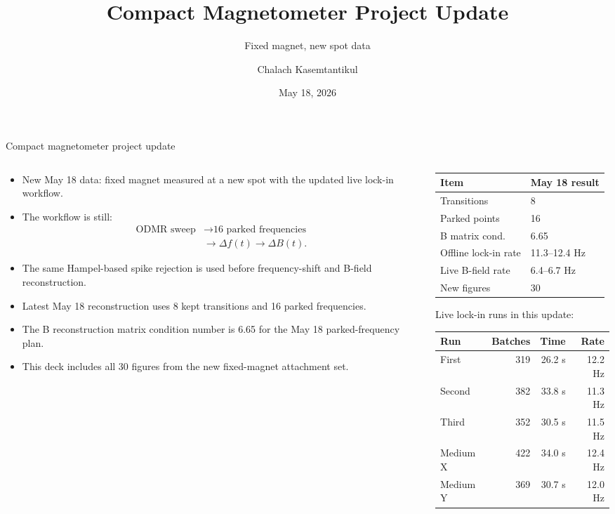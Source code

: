 \documentclass[aspectratio=169,10pt]{beamer}
\title{Compact Magnetometer Project Update}
\subtitle{Fixed magnet, new spot data}
\author{Chalach Kasemtantikul}
\date{May 18, 2026}
\newcommand{\smallitemsep}{\setlength{\itemsep}{0.45em}}
\begin{document}
\begin{frame}{Compact magnetometer project update}
\begin{columns}[T,totalwidth=\textwidth]
\begin{column}{0.56\textwidth}
\begin{itemize}\smallitemsep
  \item New May 18 data: fixed magnet measured at a new spot with the updated live lock-in workflow.
  \item The workflow is still:
  \[
  \begin{aligned}
  \text{ODMR sweep} &\rightarrow \text{16 parked frequencies} \\
  &\rightarrow \Delta f(t) \rightarrow \Delta B(t).
  \end{aligned}
  \]
  \item The same Hampel-based spike rejection is used before frequency-shift and B-field reconstruction.
  \item Latest May 18 reconstruction uses 8 kept transitions and 16 parked frequencies.
  \item The B reconstruction matrix condition number is 6.65 for the May 18 parked-frequency plan.
  \item This deck includes all 30 figures from the new fixed-magnet attachment set.
\end{itemize}
\end{column}
\begin{column}{0.40\textwidth}
\centering
\begin{tabular}{@{}ll@{}}
\toprule
Item & May 18 result \\
\midrule
Transitions & 8 \\
Parked points & 16 \\
B matrix cond. & 6.65 \\
Offline lock-in rate & 11.3--12.4 Hz \\
Live B-field rate & 6.4--6.7 Hz \\
New figures & 30 \\
\bottomrule
\end{tabular}

\vspace{1.0em}
\scriptsize
Live lock-in runs in this update:

\vspace{0.15em}
\begin{tabular}{@{}lrrr@{}}
\toprule
Run & Batches & Time & Rate \\
\midrule
First & 319 & 26.2 s & 12.2 Hz \\
Second & 382 & 33.8 s & 11.3 Hz \\
Third & 352 & 30.5 s & 11.5 Hz \\
Medium X & 422 & 34.0 s & 12.4 Hz \\
Medium Y & 369 & 30.7 s & 12.0 Hz \\
\bottomrule
\end{tabular}
\end{column}
\end{columns}
\end{frame}
\end{document}
